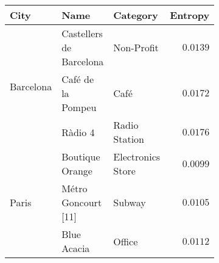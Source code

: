 \begin{figure}[p]
\begin{subfigure}{0.45\textheight}\centering
\begin{tabular}{lllr}
	\toprule
	City                       & Name                            & Category                 & Entropy \\
	\midrule
	\multirow{3}{*}{Barcelona} & Castellers de Barcelona         & Non-Profit               & $0.0139$ \\
	                           & Café de la Pompeu               & Café                     & $0.0172$ \\
	                           & Ràdio 4                         & Radio Station            & $0.0176$ \\
	\midrule
	\multirow{3}{*}{Paris}     & Boutique Orange                 & Electronics Store        & $0.0099$ \\
	                           & Métro Goncourt [11]             & Subway                   & $0.0105$ \\
	                           & Blue Acacia                     & Office                   & $0.0112$ \\
	\midrule

\end{tabular}
\end{subfigure}
\end{figure}
